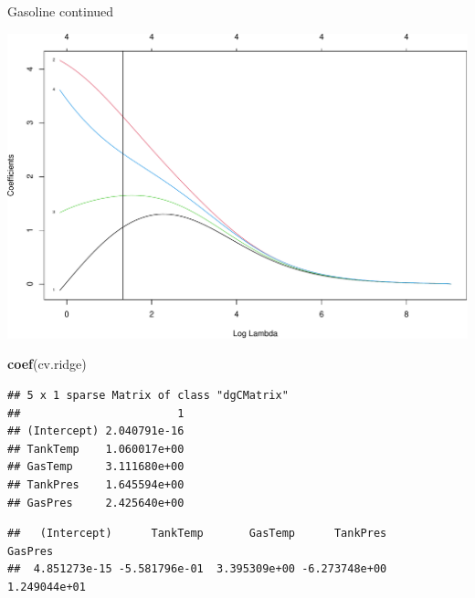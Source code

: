 \documentclass[
  ignorenonframetext,
]{beamer}
\newenvironment{Shaded}{\begin{snugshade}}{\end{snugshade}}
\newcommand{\CommentTok}[1]{\textcolor[rgb]{0.56,0.35,0.01}{\textit{#1}}}
\newcommand{\DataTypeTok}[1]{\textcolor[rgb]{0.13,0.29,0.53}{#1}}
\newcommand{\FloatTok}[1]{\textcolor[rgb]{0.00,0.00,0.81}{#1}}
\newcommand{\KeywordTok}[1]{\textcolor[rgb]{0.13,0.29,0.53}{\textbf{#1}}}
\newcommand{\NormalTok}[1]{#1}
\newcommand{\OperatorTok}[1]{\textcolor[rgb]{0.81,0.36,0.00}{\textbf{#1}}}
\newcommand{\OtherTok}[1]{\textcolor[rgb]{0.56,0.35,0.01}{#1}}
\newcommand{\StringTok}[1]{\textcolor[rgb]{0.31,0.60,0.02}{#1}}
\begin{document}
\begin{frame}[fragile]
\begin{block}{Gasoline continued}
\begin{Shaded}
\end{Shaded}

\includegraphics{L2_files/figure-beamer/unnamed-chunk-10-2.pdf}

\begin{Shaded}
\begin{Highlighting}[]
\KeywordTok{coef}\NormalTok{(cv.ridge)}
\end{Highlighting}
\end{Shaded}

\begin{verbatim}
## 5 x 1 sparse Matrix of class "dgCMatrix"
##                        1
## (Intercept) 2.040791e-16
## TankTemp    1.060017e+00
## GasTemp     3.111680e+00
## TankPres    1.645594e+00
## GasPres     2.425640e+00
\end{verbatim}

\begin{Shaded}
\end{Shaded}

\begin{verbatim}
##   (Intercept)      TankTemp       GasTemp      TankPres       GasPres 
##  4.851273e-15 -5.581796e-01  3.395309e+00 -6.273748e+00  1.249044e+01
\end{verbatim}


\end{block}
\end{frame}
\end{document}
